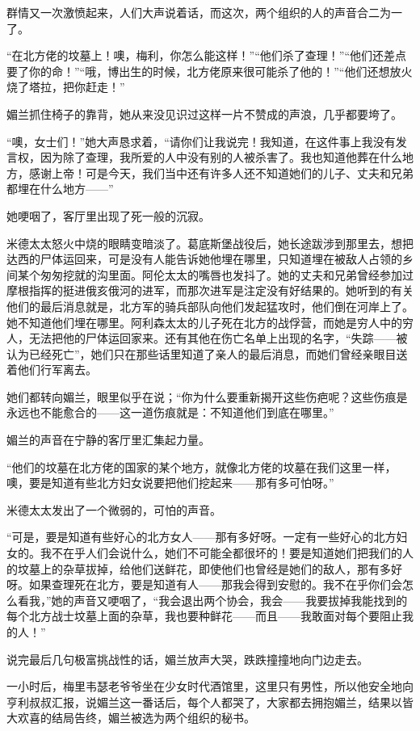 \par 群情又一次激愤起来，人们大声说着话，而这次，两个组织的人的声音合二为一了。
\par “在北方佬的坟墓上！噢，梅利，你怎么能这样！”“他们杀了查理！”“他们还差点要了你的命！”“哦，博出生的时候，北方佬原来很可能杀了他的！”“他们还想放火烧了塔拉，把你赶走！”
\par 媚兰抓住椅子的靠背，她从来没见识过这样一片不赞成的声浪，几乎都要垮了。
\par “噢，女士们！”她大声恳求着，“请你们让我说完！我知道，在这件事上我没有发言权，因为除了查理，我所爱的人中没有别的人被杀害了。我也知道他葬在什么地方，感谢上帝！可是今天，我们当中还有许多人还不知道她们的儿子、丈夫和兄弟都埋在什么地方——”
\par 她哽咽了，客厅里出现了死一般的沉寂。
\par 米德太太怒火中烧的眼睛变暗淡了。葛底斯堡战役后，她长途跋涉到那里去，想把达西的尸体运回来，可是没有人能告诉她他埋在哪里，只知道埋在被敌人占领的乡间某个匆匆挖就的沟里面。阿伦太太的嘴唇也发抖了。她的丈夫和兄弟曾经参加过摩根指挥的挺进俄亥俄河的进军，而那次进军是注定没有好结果的。她听到的有关他们的最后消息就是，北方军的骑兵部队向他们发起猛攻时，他们倒在河岸上了。她不知道他们埋在哪里。阿利森太太的儿子死在北方的战俘营，而她是穷人中的穷人，无法把他的尸体运回家来。还有其他在伤亡名单上出现的名字，“失踪——被认为已经死亡”，她们只在那些话里知道了亲人的最后消息，而她们曾经亲眼目送着他们行军离去。
\par 她们都转向媚兰，眼里似乎在说；“你为什么要重新揭开这些伤疤呢？这些伤痕是永远也不能愈合的——这一道伤痕就是：不知道他们到底在哪里。”
\par 媚兰的声音在宁静的客厅里汇集起力量。
\par “他们的坟墓在北方佬的国家的某个地方，就像北方佬的坟墓在我们这里一样，噢，要是知道有些北方妇女说要把他们挖起来——那有多可怕呀。”
\par 米德太太发出了一个微弱的，可怕的声音。
\par “可是，要是知道有些好心的北方女人——那有多好呀。一定有一些好心的北方妇女的。我不在乎人们会说什么，她们不可能全都很坏的！要是知道她们把我们的人的坟墓上的杂草拔掉，给他们送鲜花，即使他们也曾经是她们的敌人，那有多好呀。如果查理死在北方，要是知道有人——那我会得到安慰的。我不在乎你们会怎么看我，”她的声音又哽咽了，“我会退出两个协会，我会——我要拔掉我能找到的每个北方战士坟墓上面的杂草，我也要种鲜花——而且——我敢面对每个要阻止我的人！”
\par 说完最后几句极富挑战性的话，媚兰放声大哭，跌跌撞撞地向门边走去。
\par 一小时后，梅里韦瑟老爷爷坐在少女时代酒馆里，这里只有男性，所以他安全地向亨利叔叔汇报，说媚兰这一番话后，每个人都哭了，大家都去拥抱媚兰，结果以皆大欢喜的结局告终，媚兰被选为两个组织的秘书。
